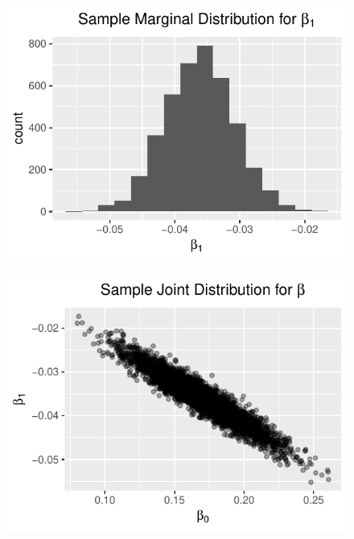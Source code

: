 \documentclass[letterpaper,11pt]{article}
\begin{document}
\begin{enumerate}
\begin{enumerate}
\begin{description}
      \begin{figure}
        \centering
        \includegraphics{p3_beta_1.pdf}
      \end{figure}

      \begin{figure}
        \centering
        \includegraphics{p3_beta_joint.pdf}
      \end{figure}
      

\end{description}
\end{enumerate}
\end{enumerate}
\end{document}
